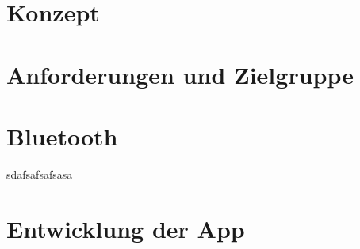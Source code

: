 \documentclass[a4paper, 12pt]{article} %
\begin{document}
\begin{spacing}{1.8}  %
\fontsize{14pt}{15pt}\selectfont  %


\end{spacing}

\clearpage

\section{Konzept}


\begin{spacing}{1.8}  %
\fontsize{14pt}{15pt}\selectfont  %


\end{spacing}

\clearpage

\section{Anforderungen und Zielgruppe}


\begin{spacing}{1.8}  %
\fontsize{14pt}{15pt}\selectfont  %


\end{spacing}

\clearpage

\section{Bluetooth}

sdafsafsafsasa\cite{wikipedia_bluetooth}

\begin{spacing}{1.8}  %
\fontsize{14pt}{15pt}\selectfont  %


\end{spacing}

\clearpage

\section{Entwicklung der App}


\begin{spacing}{1.8}  %
\fontsize{14pt}{15pt}\selectfont  %


\end{spacing}
\end{document}
